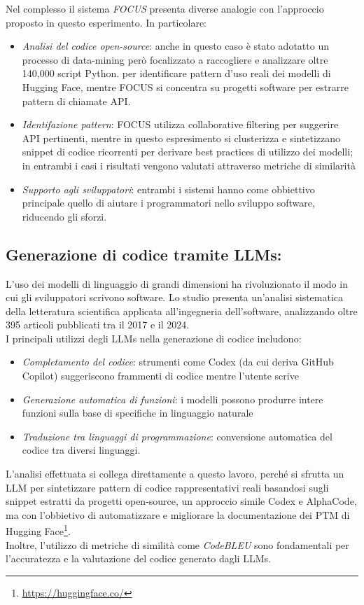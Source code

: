 \documentclass{article}
\begin{document}
Nel complesso il sistema \textit{FOCUS} presenta diverse analogie con l'approccio proposto in questo esperimento. In particolare:
\begin{itemize}
    \item \textit{Analisi del codice open-source}: anche in questo caso è stato adotatto un processo di data-mining però focalizzato a raccogliere e analizzare oltre 140,000 script Python. per identificare pattern d’uso reali dei modelli di Hugging Face, mentre FOCUS si concentra su progetti software per estrarre pattern di chiamate API.
    \item \textit{Identifazione pattern}: FOCUS utilizza collaborative filtering per suggerire API pertinenti, mentre in questo espresimento si clusterizza e sintetizzano snippet di codice ricorrenti per derivare best practices di utilizzo dei modelli; in entrambi i casi i risultati vengono valutati attraverso metriche di similarità
    \item \textit{Supporto agli sviluppatori}: entrambi i sistemi hanno come obbiettivo principale quello di aiutare i programmatori nello sviluppo software, riducendo gli sforzi.
\end{itemize}


\subsection{Generazione di codice tramite LLMs:}
L’uso dei modelli di linguaggio di grandi dimensioni ha rivoluzionato il modo in cui gli sviluppatori scrivono software. Lo studio\cite{hou2024large} presenta un'analisi sistematica della letteratura scientifica applicata all'ingegneria dell'software, analizzando oltre 395 articoli pubblicati tra il 2017 e il 2024.\\
I principali utilizzi degli LLMs nella generazione di codice includono:
\begin{itemize}
    \item \textit{Completamento del codice}: strumenti come Codex\cite{chen2021evaluatinglargelanguagemodels} (da cui deriva GitHub Copilot) suggeriscono frammenti di codice mentre l’utente scrive
    \item \textit{Generazione automatica di funzioni}: i modelli possono produrre intere funzioni sulla base di specifiche in linguaggio naturale
    \item \textit{Traduzione tra linguaggi di programmazione}: conversione automatica del codice tra diversi linguaggi.
\end{itemize}
L'analisi effettuata si collega direttamente a questo lavoro, perché si sfrutta un LLM per sintetizzare pattern di codice rappresentativi reali basandosi sugli snippet estratti da progetti open-source, un approccio simile Codex e AlphaCode\cite{Li_2022}, ma con l'obbietivo di automatizzare e migliorare la documentazione dei PTM di Hugging Face\footnote{\url{https://huggingface.co/}}.\\
Inoltre, l'utilizzo di metriche di similità come \textit{CodeBLEU} sono fondamentali per l'accuratezza e la valutazione del codice generato dagli LLMs.
\end{document}
